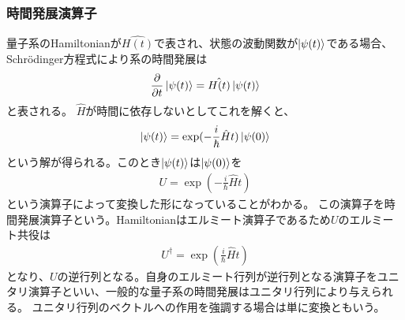         \subsubsection{時間発展演算子}
        量子系のHamiltonianが$\hat{H(t)}$で表され、状態の波動関数が$\ket{\psi(t)}$である場合、
        Schr\"{o}dinger方程式により系の時間発展は
        \begin{equation}
            \frac{\partial}{\partial t}\ket{\psi(t)} = \hat{H(t)}\ket{\psi(t)}
        \end{equation}
        と表される。
        $\hat{H}$が時間に依存しないとしてこれを解くと、
        \begin{eqnarray}
            \ket{\psi(t)} = \exp (-\frac{i}{\hbar}\hat{H}t)\ket{\psi(0)}
        \end{eqnarray}
        という解が得られる。このとき$\ket{\psi(t)}$は$\ket{\psi(0)}$を
        \begin{eqnarray}
            U = \exp (-\frac{i}{\hbar}\hat{H}t)
        \end{eqnarray}
        という演算子によって変換した形になっていることがわかる。
        この演算子を時間発展演算子という。Hamiltonianはエルミート演算子であるため$U$のエルミート共役は
        \begin{eqnarray}
            U^\dagger = \exp (\frac{i}{\hbar}\hat{H}t)
        \end{eqnarray}
        となり、$U$の逆行列となる。自身のエルミート行列が逆行列となる演算子をユニタリ演算子といい、一般的な量子系の時間発展はユニタリ行列により与えられる。
        ユニタリ行列のベクトルへの作用を強調する場合は単に変換ともいう。


